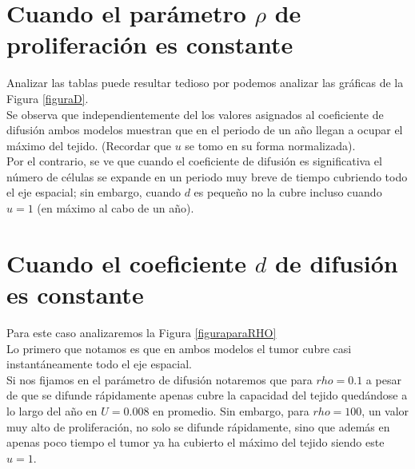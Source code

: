 \section{Cuando el parámetro $\rho$ de proliferación es constante }
	Analizar las tablas puede resultar tedioso por podemos analizar las gráficas de la Figura \ref{figuraD}.\\

	Se observa  que independientemente del los valores asignados al coeficiente de difusión ambos modelos muestran que en el periodo de un año llegan  a ocupar el máximo del tejido. (Recordar que $u$ se tomo en su forma normalizada).\\
	
	Por el contrario, se ve que cuando el coeficiente de difusión es significativa el número de células se expande en un periodo muy breve  de tiempo cubriendo todo el eje espacial; sin embargo, cuando $d$ es pequeño no la cubre incluso cuando $u=1$ (en máximo al cabo de un año).
	
\section{Cuando el coeficiente $d$ de difusión es constante}
	
	Para este caso analizaremos la Figura \ref{figuraparaRHO} \\
	
	Lo primero que notamos es que en ambos modelos el tumor cubre casi instantáneamente  todo el eje espacial.\\
	
	Si nos fijamos en el parámetro de difusión notaremos que para $rho=0.1$ a pesar de que se difunde rápidamente  apenas cubre la capacidad del tejido quedándose a lo largo del año  en $U=0.008$ en promedio. Sin embargo, para $rho=100$, un valor muy alto de proliferación, no solo se difunde rápidamente, sino que  además en apenas poco tiempo el tumor ya ha cubierto el máximo del tejido siendo este $u=1$.